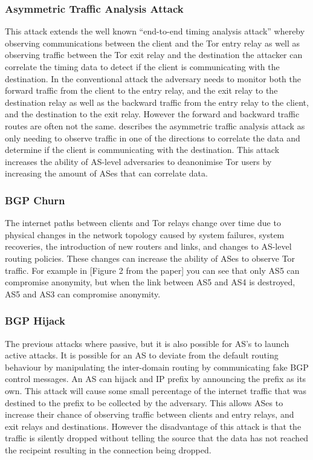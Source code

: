 \documentclass[9pt,technote]{IEEEtran}
\begin{document}
\subsubsection{Asymmetric Traffic Analysis Attack}
This attack extends the well known ``end-to-end timing analysis attack'' whereby
observing communications between the client and the Tor entry relay as well as
observing traffic between the Tor exit relay and the destination the attacker
can correlate the timing data to detect if the client is communicating with the
destination. In the conventional attack the adversary needs to monitor both the
forward traffic from the client to the entry relay, and the exit relay to the
destination relay as well as the backward traffic from the entry relay to the
client, and the destination to the exit relay. However the forward and backward
traffic routes are often not the same. \citeauthor{sun2015raptor} describes the
asymmetric traffic analysis attack as only needing to observe traffic in one of
the directions to correlate the data and determine if the client is
communicating with the destination. This attack increases the ability of
AS-level adversaries to deanonimise Tor users by increasing the amount of ASes
that can correlate data.
\subsubsection{BGP Churn}
The internet paths between clients and Tor relays change over time due to
physical changes in the network topology caused by system failures, system
recoveries, the introduction of new routers and links, and changes to AS-level
routing policies. These changes can increase the ability of ASes to observe Tor
traffic. For example in [Figure 2 from the paper] you can see that only AS5 can
compromise anonymity, but when the link between AS5 and AS4 is destroyed, AS5
and AS3 can compromise anonymity.
\subsubsection{BGP Hijack}
The previous attacks where passive, but it is also possible for AS's to launch
active attacks. It is possible for an AS to deviate from the default routing
behaviour by manipulating the inter-domain routing by communicating fake BGP
control messages. An AS can hijack and IP prefix by announcing the prefix as its
own. This attack will cause some small percentage of the internet traffic that
was destined to the prefix to be collected by the adversary. This allows ASes to
increase their chance of observing traffic between clients and entry relays, and
exit relays and destinations. However the disadvantage of this attack is that
the traffic is silently dropped without telling the source that the data has not
reached the recipeint resulting in the connection being dropped.
\end{document}
